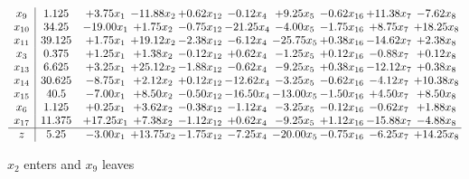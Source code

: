 \documentclass[9pt]{article}
\begin{document}
 \[\begin{array}{c| c c@{\hskip 2pt} c@{\hskip 2pt} c@{\hskip 2pt} c@{\hskip 2pt} c@{\hskip 2pt} c@{\hskip 2pt} c@{\hskip 2pt} c@{\hskip 2pt} }
 x_{9}   &  1.125 & +  3.75 x_{1} & -11.88 x_{2} & +  0.62 x_{12} & -0.12 x_{4} & +  9.25 x_{5} & -0.62 x_{16} & + 11.38 x_{7} & -7.62 x_{8}\\
 x_{10}   &  34.25 & -19.00 x_{1} & +  1.75 x_{2} & -0.75 x_{12} & -21.25 x_{4} & -4.00 x_{5} & -1.75 x_{16} & +  8.75 x_{7} & + 18.25 x_{8}\\
 x_{11}   &  39.125 & +  1.75 x_{1} & + 19.12 x_{2} & -2.38 x_{12} & -6.12 x_{4} & -25.75 x_{5} & +  0.38 x_{16} & -14.62 x_{7} & +  2.38 x_{8}\\
 x_{3}   &  0.375 & +  1.25 x_{1} & +  1.38 x_{2} & -0.12 x_{12} & +  0.62 x_{4} & -1.25 x_{5} & +  0.12 x_{16} & -0.88 x_{7} & +  0.12 x_{8}\\
 x_{13}   &  6.625 & +  3.25 x_{1} & + 25.12 x_{2} & -1.88 x_{12} & -0.62 x_{4} & -9.25 x_{5} & +  0.38 x_{16} & -12.12 x_{7} & +  0.38 x_{8}\\
 x_{14}   &  30.625 & -8.75 x_{1} & +  2.12 x_{2} & +  0.12 x_{12} & -12.62 x_{4} & -3.25 x_{5} & -0.62 x_{16} & -4.12 x_{7} & + 10.38 x_{8}\\
 x_{15}   &  40.5 & -7.00 x_{1} & +  8.50 x_{2} & -0.50 x_{12} & -16.50 x_{4} & -13.00 x_{5} & -1.50 x_{16} & +  4.50 x_{7} & +  8.50 x_{8}\\
 x_{6}   &  1.125 & +  0.25 x_{1} & +  3.62 x_{2} & -0.38 x_{12} & -1.12 x_{4} & -3.25 x_{5} & -0.12 x_{16} & -0.62 x_{7} & +  1.88 x_{8}\\
 x_{17}   &  11.375 & + 17.25 x_{1} & +  7.38 x_{2} & -1.12 x_{12} & +  0.62 x_{4} & -9.25 x_{5} & +  1.12 x_{16} & -15.88 x_{7} & -4.88 x_{8}\\
\hline
z    &  5.25 & -3.00 x_{1} & + 13.75 x_{2} & -1.75 x_{12} & -7.25 x_{4} & -20.00 x_{5} & -0.75 x_{16} & -6.25 x_{7} & + 14.25 x_{8}\\
\end{array}\]


 $ x_{2} $ enters and $ x_{9} $ leaves 
\end{document}
